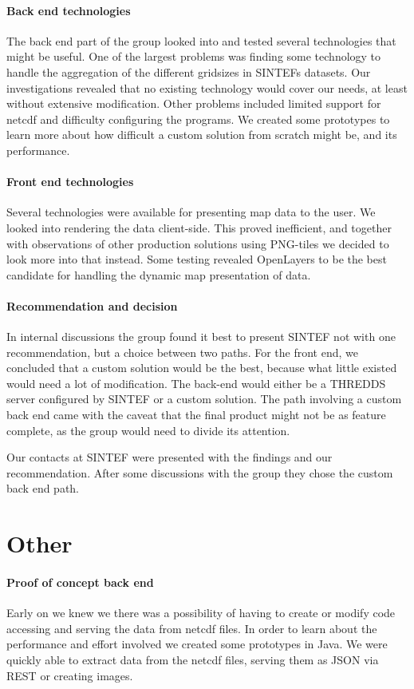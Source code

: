 \documentclass[11pt,a4paper,titlepage,oneside]{report}
\begin{document}
\paragraph{Back end technologies}
The back end part of the group looked into and tested several technologies that might be useful. One of the largest problems was finding some technology to handle the aggregation of the different gridsizes in SINTEFs datasets. Our investigations revealed that no existing technology would cover our needs, at least without extensive modification. Other problems included limited support for \gls{netcdf} and difficulty configuring the programs. We created some prototypes to learn more about how difficult a custom solution from scratch might be, and its performance.

\paragraph{Front end technologies}
Several technologies were available for presenting map data to the user. We looked into rendering the data client-side. This proved inefficient, and together with observations of other production solutions using \gls{PNG}-tiles we decided to look more into that instead. Some testing revealed OpenLayers to be the best candidate for handling the dynamic map presentation of data.

\paragraph{Recommendation and decision}
In internal discussions the group found it best to present SINTEF not with one recommendation, but a choice between two paths. For the front end, we concluded that a custom solution would be the best, because what little existed would need a lot of modification. The back-end would either be a \gls{THREDDS} server configured by SINTEF or a custom solution. The path involving a custom back end came with the caveat that the final product might not be as feature complete, as the group would need to divide its attention.
\par Our contacts at SINTEF were presented with the findings and our recommendation. After some discussions with the group they chose the custom back end path.

\section{Other}

\paragraph{Proof of concept back end}
Early on we knew we there was a possibility of having to create or modify code accessing and serving the data from \gls{netcdf} files. In order to learn about the performance and effort involved we created some prototypes in Java. We were quickly able to extract data from the \gls{netcdf} files, serving them as JSON via REST or creating images.
\end{document}
